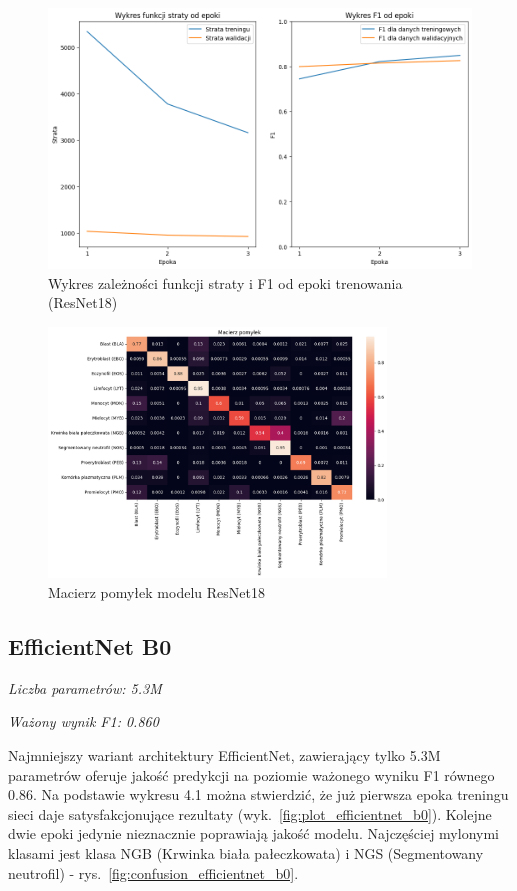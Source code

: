 \begin{figure}
    \centering
    \includegraphics[width=\textwidth]{experiments/resnet18/combined}
    \caption{Wykres zależności funkcji straty i F1 od epoki trenowania (ResNet18)}
    \label{fig:plot_resnet18}
\end{figure}
\begin{figure}
    \centering
    \includegraphics[width=0.8\textwidth]{experiments/resnet18/confusion_matrix}
    \caption{Macierz pomyłek modelu ResNet18}
    \label{fig:confusion_resnet18}
\end{figure}

\subsection{EfficientNet B0}
\textit{Liczba parametrów: 5.3M}

\textit{Ważony wynik F1: 0.860}

Najmniejszy wariant architektury EfficientNet, zawierający tylko 5.3M parametrów oferuje jakość predykcji na poziomie ważonego wyniku F1 równego 0.86.
Na podstawie wykresu 4.1 można stwierdzić, że już pierwsza epoka treningu sieci daje satysfakcjonujące rezultaty (wyk.~\ref{fig:plot_efficientnet_b0}).
Kolejne dwie epoki jedynie nieznacznie poprawiają jakość modelu.
Najczęściej mylonymi klasami jest klasa NGB (Krwinka biała pałeczkowata) i NGS (Segmentowany neutrofil) - rys.~\ref{fig:confusion_efficientnet_b0}.

